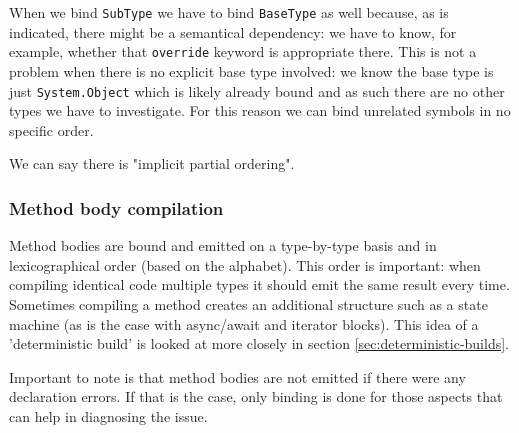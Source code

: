 When we bind \texttt{SubType} we have to bind \texttt{BaseType} as well because, as is indicated, there might be a semantical dependency: we have to know, for example, whether that \texttt{override} keyword is appropriate there. This is not a problem when there is no explicit base type involved: we know the base type is just \texttt{System.Object} which is likely already bound and as such there are no other types we have to investigate. For this reason we can bind unrelated symbols in no specific order.

\noindent We can say there is "implicit partial ordering".\parencite{Sadov2014}

\subsubsection{Method body compilation }
\label{sec:concur-method-body-compilation}

Method bodies are bound and emitted on a type-by-type basis and in lexicographical order (based on the alphabet). This order is important: when compiling identical code multiple types it should \gls{emit} the same result every time. Sometimes compiling a method creates an additional structure such as a state machine (as is the case with async/await and iterator blocks). This idea of a 'deterministic build' is looked at more closely in section \ref{sec:deterministic-builds}. 

Important to note is that method bodies are not emitted if there were any declaration errors. If that is the case, only binding is done for those aspects that can help in diagnosing the issue.\parencite{Sadov2014}

